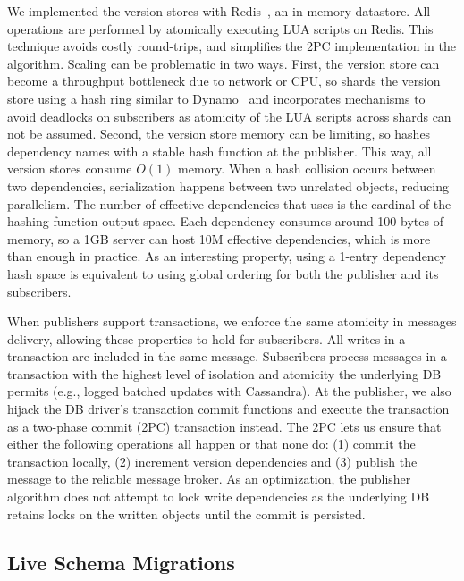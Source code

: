  \label{sec:arch:hashing}
We implemented the version stores with Redis~\cite{redis}, an in-memory
datastore. All \synapse operations are performed by atomically executing LUA scripts
on Redis. This technique avoids costly round-trips, and simplifies the 2PC
implementation in the algorithm. Scaling can be problematic in two ways.
First, the version store can become a throughput bottleneck due to
network or CPU, so \synapse shards the version store using a hash
ring similar to Dynamo~\cite{paper:dynamo} and incorporates mechanisms to avoid
deadlocks on subscribers as atomicity of the LUA scripts across shards
can not be assumed. 
Second, the version store memory can be limiting, so \synapse hashes
dependency names with a stable hash function at the publisher. This way,
all version stores consume $O(1)$ memory.
When a hash collision occurs between two dependencies, serialization happens
between two unrelated objects, reducing parallelism.
The number of effective dependencies that \synapse uses is the cardinal of the
hashing function output space.
Each dependency consumes around 100 bytes of memory, so a 1GB server can host
10M effective dependencies, which is more than enough in practice.
As an interesting property, using a 1-entry dependency hash space is equivalent
to using global ordering for both the publisher and its subscribers.

\label{sec:arch:transactions}
When publishers support transactions, we enforce the same atomicity in messages delivery, allowing these properties to hold for subscribers.  All
writes in a transaction are included in the same message.
Subscribers process messages in a transaction with the highest level of isolation
and atomicity the underlying DB permits (e.g., logged batched updates with Cassandra).
At the publisher, we also hijack the DB driver's transaction commit functions and
execute the transaction as a two-phase commit (2PC) transaction instead.  The
2PC lets us ensure that either the following operations all happen or that none do:
(1) commit the transaction locally, (2) increment version dependencies and (3)
publish the message to the reliable message broker. As an optimization,
the publisher algorithm does not attempt to lock write dependencies as the
underlying DB retains locks on the written objects until the commit is persisted.

\subsection{Live Schema Migrations} \label{sec:arch:migations}

